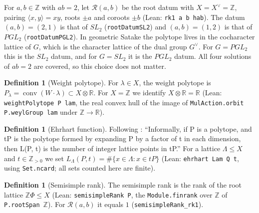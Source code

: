 \documentclass[11pt]{article}
\theoremstyle{remark}
\theoremstyle{definition}
\newtheorem{definition}[theorem]{Definition}
\begin{document}
For $a,b\in\mathbb{Z}$ with $ab = 2$, let $\mathcal{R}(a,b)$ be the root datum with
$X = X^\vee = \mathbb{Z}$, pairing $\langle x,y\rangle = xy$, roots $\pm a$ and coroots $\pm b$
(Lean: \texttt{rk1 a b hab}). The datum $(a,b) = (2,1)$ is that of $SL_2$
(\texttt{rootDatumSL2}) and $(a,b) = (1,2)$ is that of $PGL_2$ (\texttt{rootDatumPGL2}). In geometric
Satake the polytope lives in the cocharacter lattice of $G$, which is the character lattice of the
dual group $G^\vee$. For $G = PGL_2$ this is the $SL_2$ datum, and for $G = SL_2$ it is the $PGL_2$
datum. All four solutions of $ab = 2$ are covered, so this choice does not matter.

\begin{definition}[Weight polytope]
For $\lambda\in X$, the weight polytope is
$P_\lambda = \operatorname{conv}(W\cdot\lambda)\subset X\otimes\mathbb{R}$. For $X = \mathbb{Z}$ we
identify $X\otimes\mathbb{R} = \mathbb{R}$ (Lean: \texttt{weightPolytope P lam}, the real convex hull of
the image of \texttt{MulAction.orbit P.weylGroup lam} under $\mathbb{Z}\to\mathbb{R}$).
\end{definition}

\begin{definition}[Ehrhart function]
Following \cite{wiki}: ``Informally, if P is a polytope, and tP is the polytope formed by expanding P
by a factor of t in each dimension, then L(P, t) is the number of integer lattice points in tP.''
For a lattice $\Lambda\le X$ and $t\in\mathbb{Z}_{>0}$ we set
$L_\Lambda(P,t) = \#\{x\in\Lambda : x\in tP\}$ (Lean: \texttt{ehrhart Lam Q t}, using
\texttt{Set.ncard}; all sets counted here are finite).
\end{definition}

\begin{definition}[Semisimple rank]
The semisimple rank is the rank of the root lattice $\mathbb{Z}\Phi\le X$ (Lean:
\texttt{semisimpleRank P}, the \texttt{Module.finrank} over $\mathbb{Z}$ of
\texttt{P.rootSpan}~$\mathbb{Z}$). For $\mathcal{R}(a,b)$ it equals $1$ (\texttt{semisimpleRank\_rk1}).
\end{definition}
\end{document}
